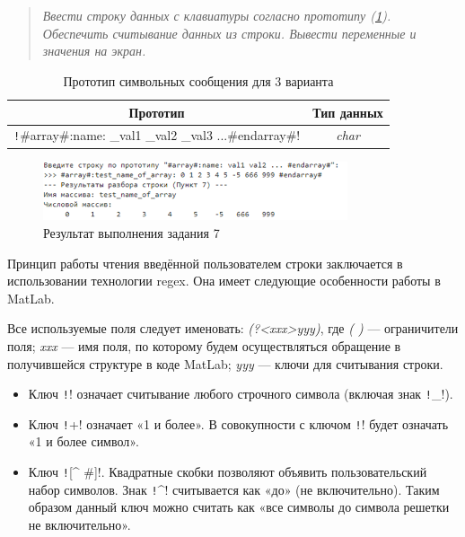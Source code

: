 \section*{  }
\begin{quote}
    \textit{Ввести строку данных с клавиатуры согласно прототипу (\cref{table:ex7}). Обеспечить считывание данных из строки. Вывести переменные и значения на экран.}
\end{quote}

\begin{table}[H]
    \centering
    \caption{Прототип символьных сообщения для 3 варианта}
    \label{table:ex7}
    \begin{tabular}{cc}
            Прототип & Тип данных \\
        \toprule
            \texttt!#array#:name: _val1 _val2 _val3 ...#endarray#! & \textit{char}
    \end{tabular}
\end{table}


\begin{figure}[H]
    \centering
    \includegraphics[width=0.8\textwidth]{figs/ex7.png}
    \caption{Результат выполнения задания 7}
    \label{fig:Результат выполнения задания 7}
\end{figure}

Принцип работы чтения введённой пользователем строки заключается в использовании технологии regex. Она имеет следующие особенности работы в MatLab.

Все используемые поля следует именовать: \textit{(?<xxx>yyy)}, где \textit{( )} — ограничители поля; \textit{xxx} — имя поля, по которому будем осуществляться обращение в получившейся структуре в коде MatLab; \textit{yyy} — ключи для считывания строки.

\begin{itemize}
    \item Ключ \texttt!\w! означает считывание любого строчного символа (включая знак \texttt!_!).
    \item Ключ \texttt!+! означает «1 и более». В совокупности с ключом \texttt!\w! будет означать «1 и более символ».
	\item Ключ \texttt![^ #]!. Квадратные скобки позволяют объявить пользовательский набор символов. Знак \texttt!^! считывается как «до» (не включительно). Таким образом данный ключ можно считать как «все символы до символа решетки не включительно».
\end{itemize}
	
